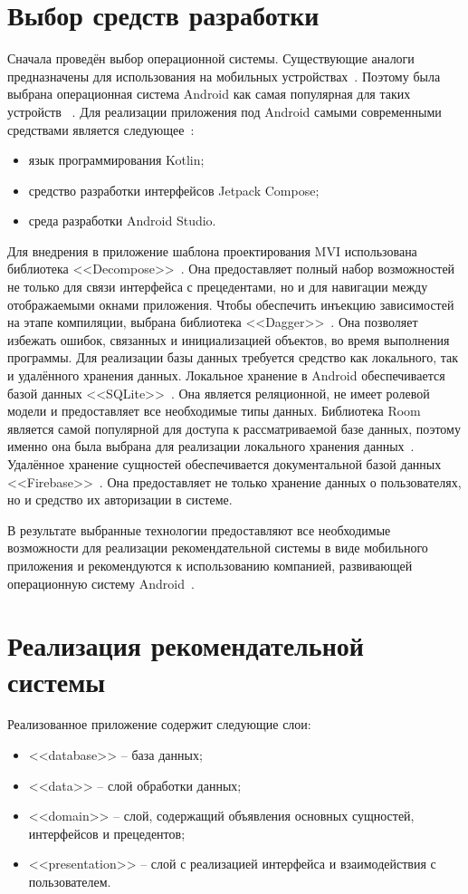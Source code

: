 \section{Выбор средств разработки}
Сначала проведён выбор операционной системы.
Существующие аналоги предназначены для использования на мобильных устройствах~\cite{app_foodru}.
Поэтому была выбрана операционная система Android как самая популярная для таких устройств ~\cite{ghazawneh2013dual}.
Для реализации приложения под Android самыми современными средствами является следующее~\cite{android_developers}:
\begin{itemize}
	\item язык программирования Kotlin;
	\item средство разработки интерфейсов Jetpack Compose;
	\item среда разработки Android Studio.
\end{itemize}
Для внедрения в приложение шаблона проектирования MVI использована библиотека <<Decompose>>~\cite{arkivanov}.
Она предоставляет полный набор возможностей не только для связи интерфейса с прецедентами, но и для навигации между отображаемыми окнами приложения.
Чтобы обеспечить инъекцию зависимостей на этапе компиляции, выбрана библиотека <<Dagger>>~\cite{dagger}.
Она позволяет избежать ошибок, связанных и инициализацией объектов, во время выполнения программы.
Для реализации базы данных требуется средство как локального, так и удалённого хранения данных.
Локальное хранение в Android обеспечивается базой данных <<SQLite>>~\cite{room}.
Она является реляционной, не имеет ролевой модели и предоставляет все необходимые типы данных.
Библиотека Room является самой популярной для доступа к рассматриваемой базе данных, поэтому именно она была выбрана для реализации локального хранения данных~\cite{room}.
Удалённое хранение сущностей обеспечивается документальной базой данных <<Firebase>>~\cite{firebase}.
Она предоставляет не только хранение данных о пользователях, но и средство их авторизации в системе.

В результате выбранные технологии предоставляют все необходимые возможности для реализации рекомендательной системы в виде мобильного приложения и рекомендуются к использованию компанией, развивающей операционную систему Android~\cite{android_developers}.

\section{Реализация рекомендательной системы}
Реализованное приложение содержит следующие слои:
\begin{itemize}
	\item <<database>> -- база данных;
	\item <<data>> -- слой обработки данных;
	\item <<domain>> -- слой, содержащий объявления основных сущностей, интерфейсов и прецедентов;
	\item <<presentation>> -- слой с реализацией интерфейса и взаимодействия с пользователем.
\end{itemize}

